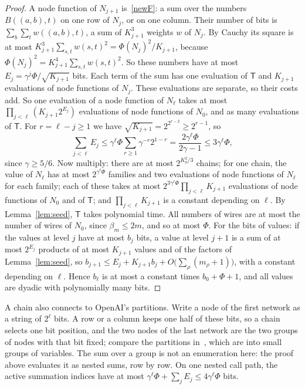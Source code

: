 \documentclass[11pt]{article}
\begin{document}
\begin{proof}
A node function of $N_{j+1}$ is~\eqref{newF}: a sum over the numbers $B((a,b),t)$ on one row of $N_j$, or on one column. Their number of bits is $\sum_b\sum_tw((a,b),t)$, a sum of $K_{j+1}^3$ weights $w$ of $N_j$. By Cauchy its square is at most $K_{j+1}^3\sum_{s,t}w(s,t)^2=\Phi(N_j)^2/K_{j+1}$, because $\Phi(N_j)^2=K_{j+1}^4\sum_{s,t}w(s,t)^2$. So these numbers have at most $E_j=\gamma^j\Phi/\sqrt{K_{j+1}}$ bits. Each term of the sum has one evaluation of $\mathsf T$ and $K_{j+1}$ evaluations of node functions of $N_j$. These evaluations are separate, so their costs add. So one evaluation of a node function of $N_\ell$ takes at most $\prod_{j<\ell}(K_{j+1}2^{E_j})$ evaluations of node functions of $N_0$, and as many evaluations of $\mathsf T$. For $r=\ell-j\ge1$ we have $\sqrt{K_{j+1}}=2^{2^{r-2}}\ge2^{r-1}$, so
\[
\sum_{j<\ell}E_j\le\gamma^\ell\Phi\sum_{r\ge1}\gamma^{-r}2^{1-r}=\frac{2\gamma^\ell\Phi}{2\gamma-1}\le3\gamma^\ell\Phi,
\]
since $\gamma\ge5/6$. Now multiply: there are at most $2^{K_0^2/3}$ chains; for one chain, the value of $N_\ell$ has at most $2^{\gamma^\ell\Phi}$ families and two evaluations of node functions of $N_\ell$ for each family; each of these takes at most $2^{3\gamma^\ell\Phi}\prod_{j<\ell}K_{j+1}$ evaluations of node functions of $N_0$ and of $\mathsf T$; and $\prod_{j<\ell}K_{j+1}$ is a constant depending on $\ell$. By Lemma~\ref{lem:seed}, $\mathsf T$ takes polynomial time. All numbers of wires are at most the number of wires of $N_0$, since $\beta_m\le2m$, and so at most $\Phi$. For the bits of values: if the values at level $j$ have at most $b_j$ bits, a value at level $j+1$ is a sum of at most $2^{E_j}$ products of at most $K_{j+1}$ values and of the factors of Lemma~\ref{lem:seed}, so $b_{j+1}\le E_j+K_{j+1}b_j+O\bigl(\sum_\rho(m_\rho+1)\bigr)$, with a constant depending on $\ell$. Hence $b_\ell$ is at most a constant times $b_0+\Phi+1$, and all values are dyadic with polynomially many bits.
\end{proof}

A chain also connects to OpenAI's partitions. Write a node of the first network as a string of $2^\ell$ bits. A row or a column keeps one half of these bits, so a chain selects one bit position, and the two nodes of the last network are the two groups of nodes with that bit fixed; compare the partitions in~\cite[Sections~2.4 and~2.7]{OAI26}, which are into small groups of variables. The sum over a group is not an enumeration here: the proof above evaluates it as nested sums, row by row. On one nested call path, the active summation indices have at most $\gamma^\ell\Phi+\sum_jE_j\le4\gamma^\ell\Phi$ bits.
\end{document}
